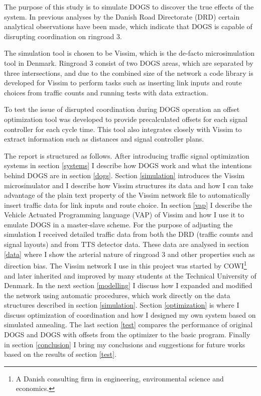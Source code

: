 The purpose of this study is to simulate DOGS to discover the true effects of the system. In previous analyses by the Danish Road Directorate (DRD) certain analytical observations have been made, which indicate that DOGS is capable of disrupting coordination on ringroad 3.

The simulation tool is chosen to be Vissim, which is the de-facto microsimulation tool in Denmark. Ringroad 3 consist of two DOGS areas, which are separated by three intersections, and due to the combined size of the network a code library is developed for Vissim to perform tasks such as inserting link inputs and route choices from traffic counts and running tests with data extraction.

To test the issue of disrupted coordination during DOGS operation an offset optimization tool was developed to provide precalculated offsets for each signal controller for each cycle time. This tool also integrates closely with Vissim to extract information such as distances and signal controller plans. 

The report is structured as follows. After introducing traffic signal optimization systems in section \ref{systems} I describe how DOGS work and what the intentions behind DOGS are in section \ref{dogs}. Section \ref{simulation} introduces the Vissim microsimulator and I describe how Vissim structures its data and how I can take advantage of the plain text property of the Vissim network file to automatically insert traffic data for link inputs and route choice. In section \ref{vap} I describe the Vehicle Actuated Programming language (VAP) of Vissim and how I use it to emulate DOGS in a master-slave scheme. For the purpose of adjusting the simulation I received detailed traffic data from both the DRD (traffic counts and signal layouts) and from TTS detector data. These data are analysed in section \ref{data} where I show the arterial nature of ringroad 3 and other properties such as direction bias. The Vissim network I use in this project was started by COWI\footnote{A Danish consulting firm in engineering, environmental science and economics.} and later inherited and improved by many students at the Technical University of Denmark. In the next section \ref{modelling} I discuss how I expanded and modified the network using automatic procedures, which work directly on the data structures described in section \ref{simulation}. Section \ref{optimization} is where I discuss optimization of coordination and how I designed my own system based on simulated annealing. The last section \ref{test} compares the performance of original DOGS and DOGS with offsets from the optimizer to the basic program. Finally in section \ref{conclusion} I bring my conclusions and suggestions for future works based on the results of section \ref{test}.

